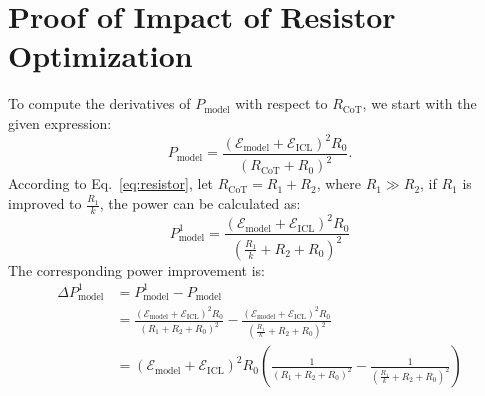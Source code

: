 \section{Proof of Impact of Resistor Optimization}\label{append:proof-resistor}
To compute the derivatives of $ P_{\text{model}} $ with respect to $ R_{\text{CoT}} $, we start with the given expression:
\begin{equation}
P_{\text{model}} = \frac{\left(\mathcal{E}_{\text{model}} + \mathcal{E}_{\text{ICL}}\right)^2 R_0}{(R_{\text{CoT}} + R_0)^2}.
\end{equation}
According to Eq.~\ref{eq:resistor}, let $ R_{\text{CoT}} = R_1 + R_2 $, where $R_1 \gg R_2$, if $R_1$ is improved to $\frac{R_1}{k}$, the power can be calculated as:
\begin{equation}
    P^1_{\text{model}} = \frac{\left(\mathcal{E}_{\text{model}} + \mathcal{E}_{\text{ICL}}\right)^2 R_0}{(\frac{R_1}{k}+R_2 + R_0)^2}
\end{equation}
The corresponding power improvement is:
\begin{align}
    \Delta P^1_{\text{model}} &=P^1_{\text{model}}-P_{\text{model}} \\
    &= \frac{\left(\mathcal{E}_{\text{model}} + \mathcal{E}_{\text{ICL}}\right)^2 R_0}{(R_1+R_2 + R_0)^2}-\frac{\left(\mathcal{E}_{\text{model}} + \mathcal{E}_{\text{ICL}}\right)^2 R_0}{(\frac{R_1}{k}+R_2 + R_0)^2}\\
    &= \left(\mathcal{E}_{\text{model}} + \mathcal{E}_{\text{ICL}}\right)^2 R_0 (\frac{1}{(R_1+R_2 + R_0)^2}-\frac{1}{(\frac{R_1}{k}+R_2 + R_0)^2})
\end{align}

